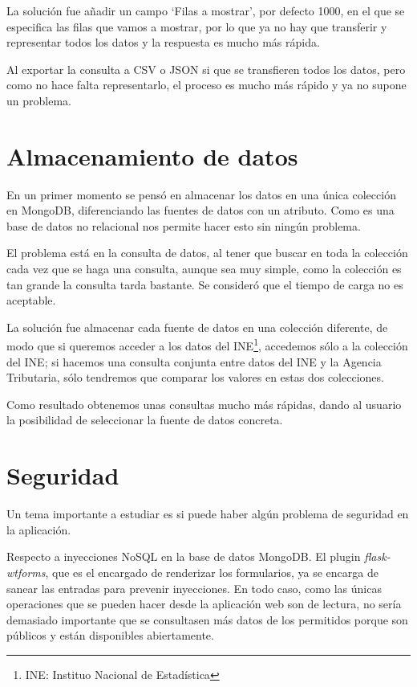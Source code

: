 La solución fue añadir un campo `Filas a mostrar', por defecto 1000, en el que se especifica las filas que vamos a mostrar, por lo que ya no hay que transferir y representar todos los datos y la respuesta es mucho más rápida.

Al exportar la consulta a CSV o JSON si que se transfieren todos los datos, pero como no hace falta representarlo, el proceso es mucho más rápido y ya no supone un problema.

\section{Almacenamiento de datos}

En un primer momento se pensó en almacenar los datos en una única colección en MongoDB, diferenciando las fuentes de datos con un atributo. Como es una base de datos no relacional nos permite hacer esto sin ningún problema.

El problema está en la consulta de datos, al tener que buscar en toda la colección cada vez que se haga una consulta, aunque sea muy simple, como la colección es tan grande la consulta tarda bastante. Se consideró que el tiempo de carga no es aceptable.

La solución fue almacenar cada fuente de datos en una colección diferente, de modo que si queremos acceder a los datos del INE\footnote{INE: Instituo Nacional de Estadística}, accedemos sólo a la colección del INE; si hacemos una consulta conjunta entre datos del INE y la Agencia Tributaria, sólo tendremos que comparar los valores en estas dos colecciones.

Como resultado obtenemos unas consultas mucho más rápidas, dando al usuario la posibilidad de seleccionar la fuente de datos concreta.

\section{Seguridad}

Un tema importante a estudiar es si puede haber algún problema de seguridad en la aplicación.

Respecto a inyecciones NoSQL en la base de datos MongoDB. El plugin \textit{flask-wtforms}, que es el encargado de renderizar los formularios, ya se encarga de sanear las entradas para prevenir inyecciones. En todo caso, como las únicas operaciones que se pueden hacer desde la aplicación web son de lectura, no sería demasiado importante que se consultasen más datos de los permitidos porque son públicos y están disponibles abiertamente.

